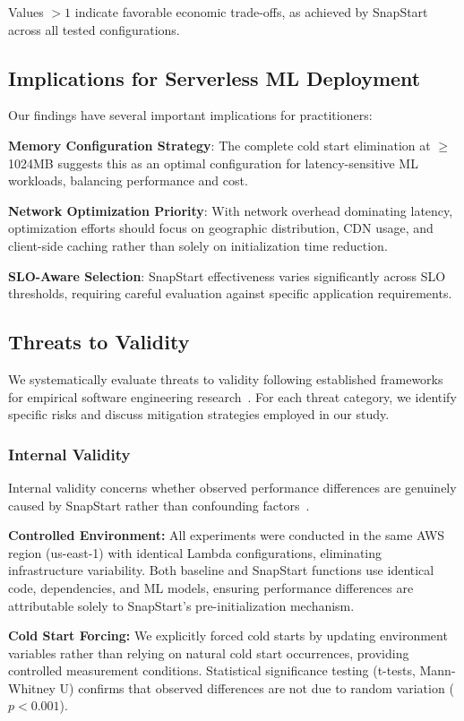 \documentclass[conference]{IEEEtran}
\begin{document}
Values $>1$ indicate favorable economic trade-offs, as achieved by SnapStart across all tested configurations.

\subsection{Implications for Serverless ML Deployment}
Our findings have several important implications for practitioners:

\textbf{Memory Configuration Strategy}: The complete cold start elimination at $\geq$1024MB suggests this as an optimal configuration for latency-sensitive ML workloads, balancing performance and cost.

\textbf{Network Optimization Priority}: With network overhead dominating latency, optimization efforts should focus on geographic distribution, CDN usage, and client-side caching rather than solely on initialization time reduction.

\textbf{SLO-Aware Selection}: SnapStart effectiveness varies significantly across SLO thresholds, requiring careful evaluation against specific application requirements.

\subsection{Threats to Validity}

We systematically evaluate threats to validity following established frameworks for empirical software engineering research~\cite{wohlin2012experimentation,feldt2010validity}. For each threat category, we identify specific risks and discuss mitigation strategies employed in our study.

\subsubsection{Internal Validity}
Internal validity concerns whether observed performance differences are genuinely caused by SnapStart rather than confounding factors~\cite{wohlin2012experimentation}.

\textbf{Controlled Environment:} All experiments were conducted in the same AWS region (us-east-1) with identical Lambda configurations, eliminating infrastructure variability. Both baseline and SnapStart functions use identical code, dependencies, and ML models, ensuring performance differences are attributable solely to SnapStart's pre-initialization mechanism.

\textbf{Cold Start Forcing:} We explicitly forced cold starts by updating environment variables rather than relying on natural cold start occurrences, providing controlled measurement conditions. Statistical significance testing (t-tests, Mann-Whitney U) confirms that observed differences are not due to random variation ($p < 0.001$).
\end{document}
